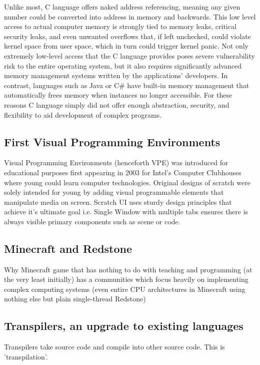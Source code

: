 \documentclass{article}
\begin{document}
Unlike most, C language offers naked address referencing, meaning any given number could be converted into address in memory and backwards. This low level access to actual computer memory is strongly tied to memory leaks, critical security leaks, and even unwanted overflows that, if left unchecked, could violate kernel space from user space, which in turn could trigger kernel panic.\citep{6234805} Not only extremely low-level access that the C language provides poses severe vulnerability risk to the entire operating system, but it also requires significantly advanced memory management systems written by the applications' developers. In contrast, languages such as Java or C\# have built-in memory management that automatically frees memory when instances no longer accessible.
For these reasons C language simply did not offer enough abstraction, security, and flexibility to aid development of complex programs.

\subsection{First Visual Programming Environments}
Visual Programming Environments (henceforth VPE) was introduced for educational purposes first appearing in 2003 for Intel's Computer Clubhouses where young could learn computer technologies. Original designs of scratch were solely intended for young by adding visual programmable elements that manipulate media on screen.
Scratch UI uses sturdy design principles that achieve it's ultimate goal i.e. Single Window with multiple tabs ensures there is always visible primary components such as scene or code.

\subsection{Minecraft and Redstone}
Why Minecraft game that has nothing to do with teaching and programming (at the very least initially) has a communities which focus heavily on implementing complex computing systems (even entire CPU architectures in Minecraft using nothing else but plain single-thread Redstone)

\subsection{Transpilers, an upgrade to existing languages}
Transpilers take source code and compile into other source code. This is 'transpilation'.
\end{document}
